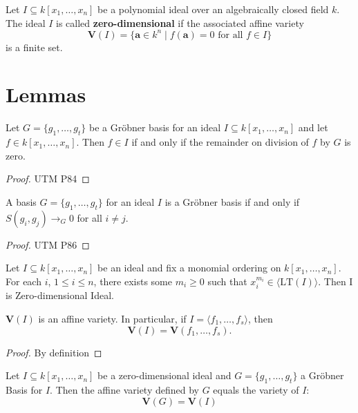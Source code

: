 \begin{definition}\label{Zerodimensional Ideal}
  Let \( I \subseteq k[x_1, \ldots, x_n] \) be a polynomial ideal over an algebraically closed field \( k \).
  The ideal \( I \) is called \textbf{zero-dimensional} if the associated affine variety
  \[
  \mathbf{V}(I) = \{\mathbf{a} \in k^n \mid f(\mathbf{a}) = 0 \text{ for all } f \in I\}
  \]
  is a finite set.
  \end{definition}

\chapter{Lemmas}
\begin{lemma}\label{groebner_basis_remainder_zero_iff_mem_span}
  Let \( G = \{g_1, \dots, g_t\} \) be a Gröbner basis for an ideal \( I \subseteq k[x_1, \dots, x_n] \) and let \( f \in k[x_1, \dots, x_n] \). Then \( f \in I \) if and only if the remainder on division of \( f \) by \( G \) is zero.
\end{lemma}
\begin{proof}
  UTM P84
\end{proof}

\begin{lemma}\label{Buchberger Criteria}
A basis \( G = \{ g_1, \ldots, g_t \} \) for an ideal \( I \) is a Gröbner basis if and only if \( S(g_i, g_j) \to_G 0 \) for all \( i \neq j \).
\end{lemma}
\begin{proof}
 UTM P86
\end{proof}

\begin{lemma}\label{verify_zero_dim_ideal}
  Let \( I \subseteq k[x_1, \ldots, x_n] \) be an ideal and fix a monomial ordering on \( k[x_1, \ldots, x_n] \). For each \( i \), \( 1 \leq i \leq n \), there exists some \( m_i \geq 0 \) such that \( x_i^{m_i} \in \langle \mathrm{LT}(I)\rangle \). Then I is Zero-dimensional Ideal.
\end{lemma}

\begin{lemma}\label{V_I_equal_V_F}
  \( \mathbf{V}(I) \) is an affine variety. In particular, if \( I = \langle f_1, \ldots, f_s \rangle \), then
  \[
  \mathbf{V}(I) = \mathbf{V}(f_1, \ldots, f_s).
  \]
\end{lemma}
\begin{proof}
  By definition
\end{proof}

\begin{lemma}\label{V_G_equal_V_I}
  Let $I \subseteq k[x_1,\ldots,x_n]$ be a zero-dimensional ideal and $G = \{g_1,\ldots,g_t\}$ a Gröbner Basis for $I$. Then the affine variety defined by $G$ equals the variety of $I$:
  \[
  \mathbf{V}(G) = \mathbf{V}(I)
  \]
\end{lemma}
